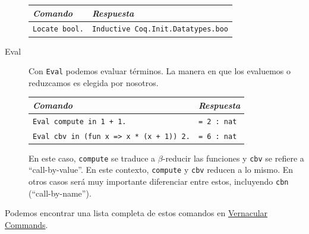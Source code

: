 \begin{description}
  \begin{center}
  \begin{tabular}{| l | l |}
  \hline
  \emph{Comando} & \emph{Respuesta} \\
  \hline
  \texttt{Locate bool.} & \texttt{Inductive Coq.Init.Datatypes.boo} \\
  \hline
  \end{tabular}
  \end{center}
  \item[Eval] Con \texttt{Eval} podemos evaluar términos. La manera en que los evaluemos o reduzcamos es elegida por nosotros.
  \begin{center}
  \begin{tabular}{| l | l |}
  \hline
  \emph{Comando} & \emph{Respuesta} \\
  \hline
  \texttt{Eval compute in 1 + 1.} & \texttt{= 2 : nat} \\
  \texttt{Eval cbv in (fun x => x * (x + 1)) 2.} & \texttt{= 6 : nat} \\
  \hline
  \end{tabular}
  \end{center}
  En este caso, \texttt{compute} se traduce a $\beta$-reducir las funciones y \texttt{cbv} se refiere a ``call-by-value''. En este contexto, \texttt{compute} y \texttt{cbv} reducen a lo mismo. En otros casos será muy importante diferenciar entre estos, incluyendo \texttt{cbn} (``call-by-name'').
\end{description}

Podemos encontrar una lista completa de estos comandos en \href{https://coq.inria.fr/refman/proof-engine/vernacular-commands.html}{Vernacular Commands}.
